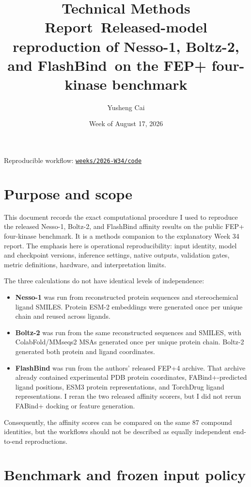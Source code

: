 \documentclass[11pt]{article}
\title{\textbf{Technical Methods Report}\
Released-model reproduction of Nesso-1, Boltz-2, and FlashBind\
on the FEP+ four-kinase benchmark}
\author{Yusheng Cai}
\date{Week of August 17, 2026}
\begin{document}
\maketitle
\begin{center}
  \small Reproducible workflow:
  \href{https://github.com/Yusheng-cai/BindingAffinityPredictor/tree/main/weeks/2026-W34/code}%
       {\texttt{weeks/2026-W34/code}}
\end{center}

\section*{Purpose and scope}

This document records the exact computational procedure I used to reproduce
the released Nesso-1, Boltz-2, and FlashBind affinity results on the public
FEP+ four-kinase benchmark. It is a methods companion to the explanatory Week
34 report. The emphasis here is operational reproducibility: input identity,
model and checkpoint versions, inference settings, native outputs, validation
gates, metric definitions, hardware, and interpretation limits.

The three calculations do not have identical levels of independence:

\begin{itemize}
  \item \textbf{Nesso-1} was run from reconstructed protein sequences and
  stereochemical ligand SMILES. Protein ESM-2 embeddings were generated once
  per unique chain and reused across ligands.
  \item \textbf{Boltz-2} was run from the same reconstructed sequences and
  SMILES, with ColabFold/MMseqs2 MSAs generated once per unique protein chain.
  Boltz-2 generated both protein and ligand coordinates.
  \item \textbf{FlashBind} was run from the authors' released FEP+4 archive.
  That archive already contained experimental PDB protein coordinates,
  FABind+-predicted ligand positions, ESM3 protein representations, and
  TorchDrug ligand representations. I reran the two released affinity
  scorers, but I did not rerun FABind+ docking or feature generation.
\end{itemize}

Consequently, the affinity scores can be compared on the same 87 compound
identities, but the workflows should not be described as equally independent
end-to-end reproductions.

\section{Benchmark and frozen input policy}
\end{document}
